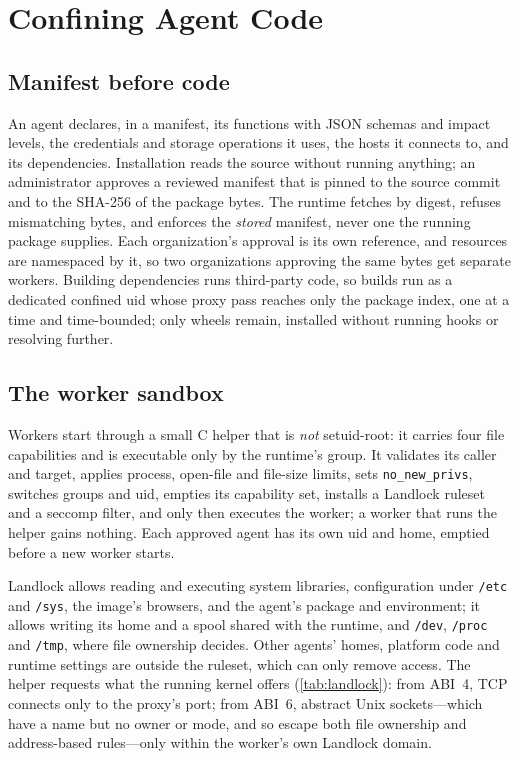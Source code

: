 \documentclass[10pt,twocolumn,a4paper]{article}
\newcommand{\code}[1]{\texttt{\small #1}}
\begin{document}
\section{Confining Agent Code}
\label{sec:confine}

\subsection{Manifest before code}
An agent declares, in a manifest, its functions with JSON schemas and
impact levels, the credentials and storage operations it uses, the
hosts it connects to, and its dependencies. Installation reads the
source without running anything; an administrator approves a reviewed
manifest that is pinned to the source commit and to the SHA-256 of the
package bytes. The runtime fetches by digest, refuses mismatching bytes,
and enforces the \emph{stored} manifest, never one the running package
supplies. Each organization's approval is its own reference, and
resources are namespaced by it, so two organizations approving the same
bytes get separate workers. Building dependencies runs third-party code, so builds run as
a dedicated confined uid whose proxy pass reaches only the package
index, one at a time and time-bounded; only wheels remain, installed
without running hooks or resolving further.

\subsection{The worker sandbox}
Workers start through a small C helper that is \emph{not} setuid-root:
it carries four file capabilities and is executable only by the
runtime's group. It validates its caller and target, applies process,
open-file and file-size limits, sets \code{no\_new\_privs}, switches
groups and uid, empties its capability set, installs a Landlock
ruleset~\cite{landlock} and a seccomp filter, and only then executes the
worker; a worker that runs the helper gains nothing. Each approved
agent has its own uid and home, emptied before a new worker starts.

Landlock allows reading and executing system libraries, configuration
under \code{/etc} and \code{/sys}, the image's browsers, and the
agent's package and environment; it allows writing its home and a
spool shared with the runtime, and \code{/dev}, \code{/proc} and
\code{/tmp}, where file ownership decides. Other agents' homes,
platform code and runtime settings are outside the ruleset, which can
only remove access.
The helper requests what the running kernel offers (\cref{tab:landlock}):
from ABI~4, TCP connects only to the proxy's port; from ABI~6, abstract
Unix sockets---which have a name but no owner or mode, and so escape
both file ownership and address-based rules---only within the worker's
own Landlock domain.
\end{document}
